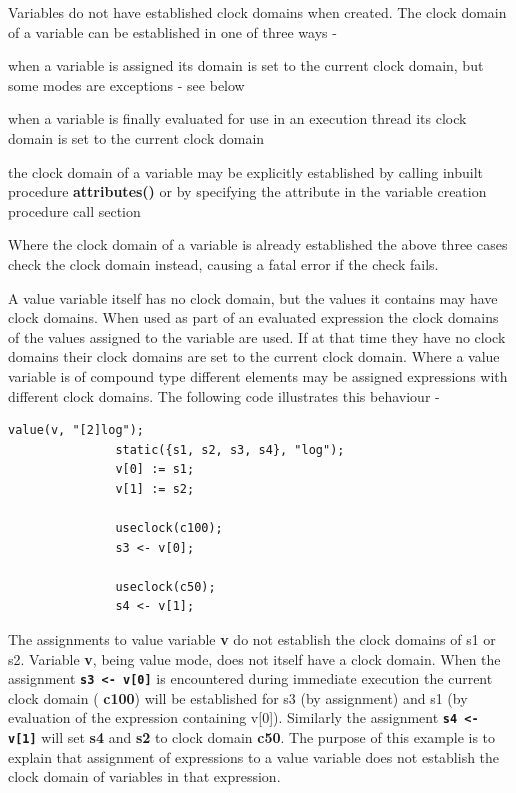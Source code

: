             Variables do not have established clock domains when created. The
            clock domain of a variable can be established in one of three ways -
            \blist
            \item   when a variable is assigned its domain is set to the current
                    clock domain, but some modes are exceptions - see below
            \item   when a variable is finally evaluated for use in an execution
                    thread its clock domain is set to the current
                    clock domain
            \item   the clock domain of a variable may be explicitly established
                    by calling inbuilt procedure {\bf attributes()} or by specifying
                    the attribute in the variable creation procedure call
                    section 
            \blend

            Where the clock domain of a variable is already established the
            above three cases check the clock domain instead, causing a fatal
            error if the check fails.
            
            A value variable itself has no clock domain, but the values it
            contains may have clock domains. When used as part of an evaluated
            expression the clock domains of the values assigned to the variable are
            used. If at that time they have no clock domains their clock domains are
            set to the current clock domain. Where a value variable is of compound
            type different elements may be assigned expressions with different clock
            domains. The following code illustrates this behaviour -
            \begin{lstlisting}[gobble=12, language=threepl]
               value(v, "[2]log");
               static({s1, s2, s3, s4}, "log");
               v[0] := s1;
               v[1] := s2;

               useclock(c100);
               s3 <- v[0];

               useclock(c50);
               s4 <- v[1];
            \end{lstlisting}
            The assignments to value variable {\bf v} do not establish the clock
            domains of s1 or s2. Variable {\bf v}, being value mode, does not itself
            have a clock domain. When the assignment {\bf \verb's3 <- v[0]'} is
            encountered during immediate execution the current clock domain ({\bf
            c100}) will be established for s3 (by assignment) and s1 (by evaluation
            of the expression containing v[0]). Similarly the assignment {\bf
            \verb's4 <- v[1]'} will set {\bf s4} and {\bf s2} to clock domain {\bf
            c50}. The purpose of this example is to explain that assignment of
            expressions to a value variable does not establish the clock domain
            of variables in that expression.
            
